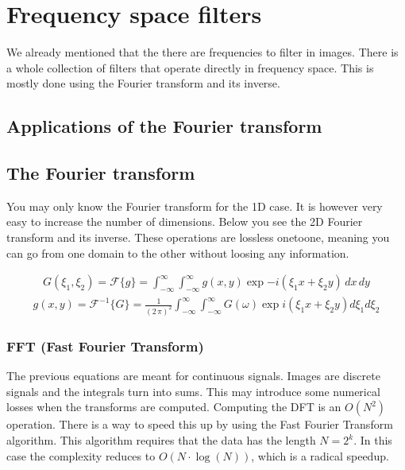 \documentclass[letterpaper,10pt,english]{sphinxmanual}
\begin{document}
\sphinxAtStartPar
{}


\chapter{Frequency space filters}
\label{\detokenize{02-ImageEnhancement:frequency-space-filters}}
\sphinxAtStartPar
We already mentioned that the there are frequencies to filter in images. There is a whole collection of filters that operate directly in frequency space. This is mostly done using the Fourier transform and its inverse.


\section{Applications of the Fourier transform}
\label{\detokenize{02-ImageEnhancement:applications-of-the-fourier-transform}}

\section{The Fourier transform}
\label{\detokenize{02-ImageEnhancement:the-fourier-transform}}
\sphinxAtStartPar
You may only know the Fourier transform for the 1D case. It is however very easy to increase the number of dimensions. Below you see the 2D Fourier transform and its inverse. These operations are lossless one\sphinxhyphen{}to\sphinxhyphen{}one, meaning you can go from one domain to the other without loosing any information.

\sphinxAtStartPar
{}
\begin{equation*}
\begin{split}G(\xi_1,\xi_2)=\mathcal{F}\{g\}=\int_{-\infty}^{\infty}\int_{-\infty}^{\infty} g(x,y)
\exp{-i(\xi_1 x+\xi_2 y)}\,dx\,dy\end{split}
\end{equation*}
\sphinxAtStartPar
{}
\begin{equation*}
\begin{split} g(x,y)=\mathcal{F}^{-1}\{G\}=\frac{1}{(2\,\pi)^2}\int_{-\infty}^{\infty}\int_{-\infty}^{\infty} G(\omega)
\exp{i(\xi_1 x+\xi_2 y)} d\xi_1 d\xi_2\end{split}
\end{equation*}

\subsection{FFT (Fast Fourier Transform)}
\label{\detokenize{02-ImageEnhancement:fft-fast-fourier-transform}}
\sphinxAtStartPar
The previous equations are meant for continuous signals. Images are discrete signals and the integrals turn into sums. This may introduce some numerical losses when the transforms are computed. Computing the DFT is an \(O(N^2)\) operation. There is a way to speed this up by using the Fast Fourier Transform algorithm. This algorithm requires that the data has the length \(N=2^k\). In this case the complexity reduces to \(O(N\cdot\log(N))\), which is a radical speed\sphinxhyphen{}up.
\end{document}

